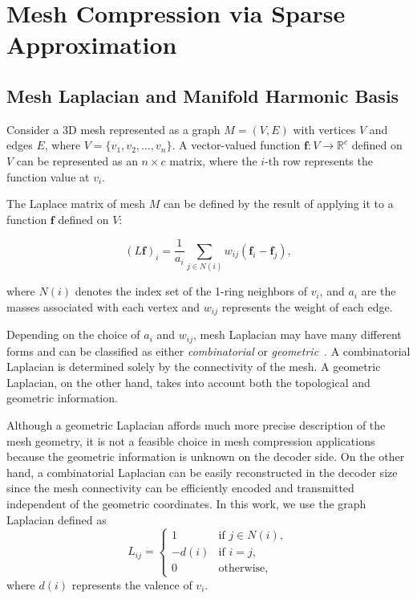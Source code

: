 \section{Mesh Compression via Sparse Approximation}

\subsection{Mesh Laplacian and Manifold Harmonic Basis}
\label{sec:mhb}

Consider a 3D mesh represented as a graph $M=(V,E)$ with vertices $V$
and edges $E$, where $V=\{v_1,v_2,\ldots,v_n\}$. A vector-valued
function $\mathbf{f}:V\to\mathbb{R}^c$ defined on $V$ can be
represented as an $n\times c$ matrix, where the $i$-th row represents
the function value at $v_i$.

The Laplace matrix of mesh $M$ can be defined by the result of applying it to
a function $\mathbf{f}$ defined on $V$:

\begin{equation}
  (L\mathbf{f})_i=\frac{1}{a_i}\sum_{j\in N(i)} w_{ij}(\mathbf{f}_i-\mathbf{f}_j),
\end{equation}

where $N(i)$ denotes the index set of the 1-ring neighbors of $v_i$,
and $a_i$ are the masses associated with each vertex and $w_{ij}$
represents the weight of each edge.

Depending on the choice of $a_i$ and $w_{ij}$, mesh Laplacian may have
many different forms and can be classified as either
\emph{combinatorial} or \emph{geometric}~\cite{Zhang:2010:CGF}. A
combinatorial Laplacian is determined solely by the connectivity of
the mesh. A geometric Laplacian, on the other hand, takes into account
both the topological and geometric information.

Although a geometric Laplacian affords much more precise description
of the mesh geometry, it is not a feasible choice in mesh compression
applications because the geometric information is unknown on the
decoder side. On the other hand, a combinatorial Laplacian can be
easily reconstructed in the decoder size since the mesh connectivity
can be efficiently encoded and transmitted independent of the
geometric coordinates. In this work, we use the graph Laplacian
defined as
\begin{equation}
L_{ij} =
\begin{cases}
1 & \text{if } j \in N(i),\\
-d(i) & \text{if } i=j,\\
0 & \text{otherwise,}
\end{cases}
\end{equation}
where $d(i)$ represents the valence of $v_i$.

